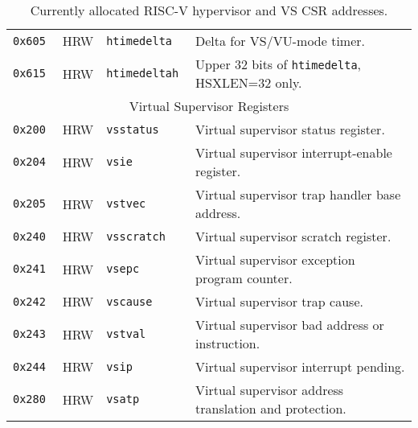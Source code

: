 \begin{table}[htb!]
\begin{center}
\begin{tabular}{|l|l|l|l|}
\hline
\tt 0x605 & HRW  &\tt htimedelta   & Delta for VS/VU-mode timer. \\
\tt 0x615 & HRW  &\tt htimedeltah  & Upper 32 bits of {\tt htimedelta}, HSXLEN=32 only. \\
\hline
\multicolumn{4}{|c|}{Virtual Supervisor Registers} \\
\hline
\tt 0x200 & HRW  &\tt vsstatus   & Virtual supervisor status register. \\
\tt 0x204 & HRW  &\tt vsie       & Virtual supervisor interrupt-enable register. \\
\tt 0x205 & HRW  &\tt vstvec     & Virtual supervisor trap handler base address. \\
\tt 0x240 & HRW  &\tt vsscratch  & Virtual supervisor scratch register. \\
\tt 0x241 & HRW  &\tt vsepc      & Virtual supervisor exception program counter. \\
\tt 0x242 & HRW  &\tt vscause    & Virtual supervisor trap cause. \\
\tt 0x243 & HRW  &\tt vstval     & Virtual supervisor bad address or instruction. \\
\tt 0x244 & HRW  &\tt vsip       & Virtual supervisor interrupt pending. \\
\tt 0x280 & HRW  &\tt vsatp      & Virtual supervisor address translation and protection. \\
\hline
\end{tabular}
\end{center}
\caption{Currently allocated RISC-V hypervisor and VS CSR addresses.}
\label{hcsrnames}
\end{table}


